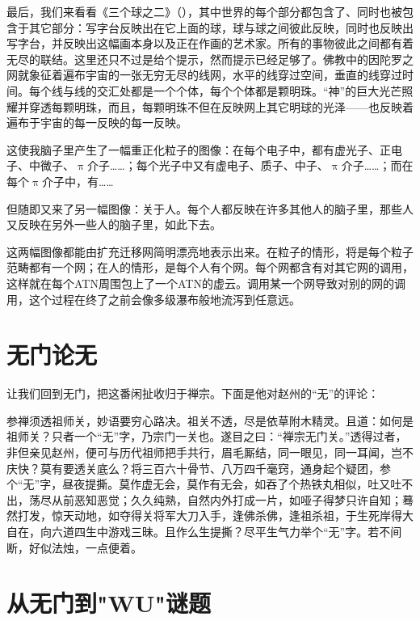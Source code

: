 最后，我们来看看《三个球之二》（），其中世界的每个部分都包含了、同时也被包含于其它部分：写字台反映出在它上面的球，球与球之间彼此反映，同时也反映出写字台，并反映出这幅画本身以及正在作画的艺术家。所有的事物彼此之间都有着无尽的联结。这里还只不过是给个提示，然而提示已经足够了。佛教中的因陀罗之网就象征着遍布宇宙的一张无穷无尽的线网，水平的线穿过空间，垂直的线穿过时间。每个线与线的交汇处都是一个个体，每个个体都是颗明珠。“神”的巨大光芒照耀并穿透每颗明珠，而且，每颗明珠不但在反映网上其它明球的光泽——也反映着遍布于宇宙的每一反映的每一反映。

这使我脑子里产生了一幅重正化粒子的图像：在每个电子中，都有虚光子、正电子、中微子、$\uppi$介子……；每个光子中又有虚电子、质子、中子、$\uppi$介子……；而在每个$\uppi$介子中，有……

但随即又来了另一幅图像：关于人。每个人都反映在许多其他人的脑子里，那些人又反映在另外一些人的脑子里，如此下去。

这两幅图像都能由扩充迁移网简明漂亮地表示出来。在粒子的情形，将是每个粒子范畴都有一个网；在人的情形，是每个人有个网。每个网都含有对其它网的调用，这样就在每个ATN周围包上了一个ATN的虚云。调用某一个网导致对别的网的调用，这个过程在终了之前会像多级瀑布般地流泻到任意远。

\section{无门论无}

让我们回到无门，把这番闲扯收归于禅宗。下面是他对赵州的“无”的评论：

\begin{zenkoan}
参禅须透祖师关，妙语要穷心路决。祖关不透，尽是依草附木精灵。且道：如何是祖师关？只者一个“无”字，乃宗门一关也。遂目之曰：“禅宗无门关。”透得过者，非但亲见赵州，便可与历代祖师把手共行，眉毛厮结，同一眼见，同一耳闻，岂不庆快？莫有要透关底么？将三百六十骨节、八万四千毫窍，通身起个疑团，参个“无”字，昼夜提撕。莫作虚无会，莫作有无会，如吞了个热铁丸相似，吐又吐不出，荡尽从前恶知恶觉；久久纯熟，自然内外打成一片，如哑子得梦只许自知；蓦然打发，惊天动地，如夺得关将军大刀入手，逢佛杀佛，逢祖杀祖，于生死岸得大自在，向六道四生中游戏三昧。且作么生提撕？尽平生气力举个“无”字。若不间断，好似法烛，一点便着。
\end{zenkoan}

\section{从无门到"WU"谜题}

